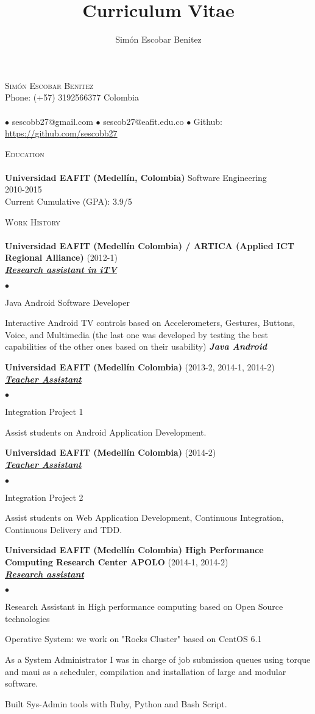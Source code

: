 \documentclass[a4paper]{article}
\title{Curriculum Vitae}
\author{Sim\'on Escobar Benitez}
\newcommand{\lineunder}{\vspace*{-8pt} \\ \hspace*{-18pt} \hrulefill \\}
\newcommand{\header}[1]{{\hspace*{-15pt}\vspace*{6pt}
\textsc{#1}} \vspace*{-6pt} \lineunder}
\newcommand{\employer}[3]{{
\textbf{#1} (#2)\\ \underline{\textbf{\emph{#3}}}\\ }}
\newcommand{\contact}[3]{
\vspace*{-8pt}
\begin{center}
{\LARGE \scshape {#1}}\\ #2 \lineunder #3
\end{center}
\vspace*{-8pt} }
\newenvironment{achievements}{\begin{list}{$\bullet$}{\topsep 0pt \itemsep
-2pt}}{\vspace*{4pt}\end{list}}
\newcommand{\schoolwithcourses}[4]{
\textbf{#1} #2 \\ #3\\ #4\\
\vspace*{5pt} }
\newcommand{\emphasys}[1]{\textbf{\emph{#1}}}
\begin{document}
\small
\smallskip
\vspace*{-44pt}
\contact{Sim\'on Escobar Benitez} { Phone: (+57) 3192566377 Colombia } { $\bullet$ sescobb27@gmail.com $\bullet$ sescob27@eafit.edu.co $\bullet$ Github: \url{https://github.com/sescobb27} }
\header{Education}
\schoolwithcourses{Universidad EAFIT (Medell\'in, Colombia)}{Software Engineering} {2010-2015} {Current Cumulative (GPA): 3.9/5}

\header{Work History}
\employer{ Universidad EAFIT (Medell\'in Colombia) / ARTICA (Applied ICT Regional Alliance)} {2012-1} {Research assistant in iTV}
\begin{achievements}
\item Java Android Software Developer
\item Interactive Android TV controls based on Accelerometers, Gestures, Buttons, Voice, and Multimedia (the last one was developed by testing the best capabilities of the other ones based on their usability) \emphasys{Java Android}
\end{achievements}
\employer{ Universidad EAFIT (Medell\'in Colombia) }{2013-2, 2014-1, 2014-2}{Teacher Assistant}
\begin{achievements}
\item Integration Project 1
\item Assist students on Android Application Development.
\end{achievements}
\employer{ Universidad EAFIT (Medell\'in Colombia) }{2014-2}{Teacher Assistant}
\begin{achievements}
\item Integration Project 2
\item Assist students on Web Application Development, Continuous Integration, Continuous Delivery and TDD.
\end{achievements}
\employer{ Universidad EAFIT (Medell\'in Colombia) High Performance Computing Research Center APOLO}{2014-1, 2014-2}{Research assistant}
\begin{achievements}
\item Research Assistant in High performance computing based on Open Source technologies
\item Operative System: we work on "Rocks Cluster" based on CentOS 6.1
\item As a System Administrator I was in charge of job submission queues using torque and maui as a scheduler, compilation and installation of large and modular software.
\item Built Sys-Admin tools with Ruby, Python and Bash Script.
\end{achievements}
\end{document}
